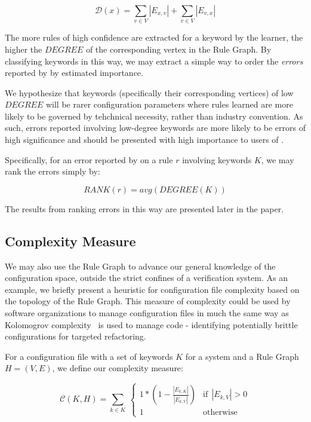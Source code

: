     $$\mathcal{D}(x) = \sum_{v \in V} |E_{x, v}| + \sum_{v \in V} |E_{v, x}|$$


The more rules of high confidence are extracted for a keyword by the learner, 
the higher the $DEGREE$ of the corresponding vertex in the Rule Graph.
By classifying keywords in this way, we may extract a simple way to
order the {\it errors} reported by \app by estimated importance.

We hypothesize that keywords (specifically their corresponding vertices)
of low $DEGREE$ will be rarer configuration
parameters where rules learned are more likely to be governed by 
tehchnical necessity, rather than industry convention. As such, errors
reported involving low-degree keywords are more likely to be errors
of high significance and should be presented with high importance
to users of \app.

Specifically, for an error reported by \app on a rule $r$ involving
keywords $K$, we may rank the errors simply by:

    $$RANK(r) = avg( DEGREE(K) )$$

The results from ranking errors in this way are presented later in
the paper.

\subsection{Complexity Measure}

We may also use the Rule Graph to advance our general knowledge
of the configuration space, outside the strict confines of a
verification system. As an example, we briefly present a heuristic
for configuration file complexity based on the topology of the
Rule Graph. This measure of complexity could be used by software
organizations to manage configuration files in much the same way
as Kolomogrov complexity~\cite{kolomogrov} is used to manage code - identifying
potentially brittle configurations for targeted refactoring.


For a configuration file with a set of keywords $K$ for a system
and a Rule Graph $H = (V, E)$, we define our complexity measure:

\begin{equation}
    \mathcal{C}(K, H) = \sum_{k \in K} \
        \begin{cases}
            1 * (1 - \frac{|E_{k, K}|}{|E_{k, V}|}) & \text{if}\ \ |E_{k, V}| > 0 \\
            1 & \text{otherwise}
        \end{cases}
\end{equation}

